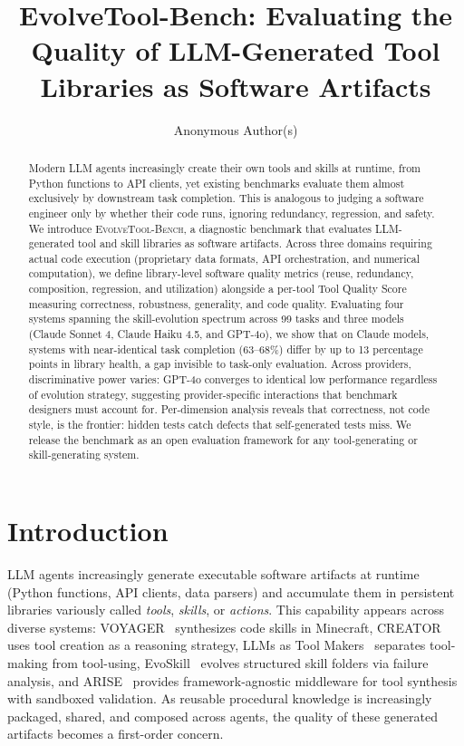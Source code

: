 \documentclass[sigplan,review,anonymous]{acmart}
\begin{document}
\title{EvolveTool-Bench: Evaluating the Quality of LLM-Generated Tool Libraries as Software Artifacts}

\author{Anonymous Author(s)}
\affiliation{\institution{}}

\begin{abstract}
Modern LLM agents increasingly create their own tools and skills at runtime, from Python functions to API clients, yet existing benchmarks evaluate them almost exclusively by downstream task completion. This is analogous to judging a software engineer only by whether their code runs, ignoring redundancy, regression, and safety. We introduce \textsc{EvolveTool-Bench}, a diagnostic benchmark that evaluates LLM-generated tool and skill libraries as software artifacts. Across three domains requiring actual code execution (proprietary data formats, API orchestration, and numerical computation), we define library-level software quality metrics (reuse, redundancy, composition, regression, and utilization) alongside a per-tool Tool Quality Score measuring correctness, robustness, generality, and code quality. Evaluating four systems spanning the skill-evolution spectrum across 99 tasks and three models (Claude Sonnet 4, Claude Haiku 4.5, and GPT-4o), we show that on Claude models, systems with near-identical task completion (63--68\%) differ by up to 13 percentage points in library health, a gap invisible to task-only evaluation. Across providers, discriminative power varies: GPT-4o converges to identical low performance regardless of evolution strategy, suggesting provider-specific interactions that benchmark designers must account for. Per-dimension analysis reveals that correctness, not code style, is the frontier: hidden tests catch defects that self-generated tests miss. We release the benchmark as an open evaluation framework for any tool-generating or skill-generating system.
\end{abstract}

\maketitle

\section{Introduction}

LLM agents increasingly generate executable software artifacts at runtime (Python functions, API clients, data parsers) and accumulate them in persistent libraries variously called \emph{tools}, \emph{skills}, or \emph{actions}. This capability appears across diverse systems: VOYAGER~\cite{wang2023voyager} synthesizes code skills in Minecraft, CREATOR~\cite{qian2023creator} uses tool creation as a reasoning strategy, LLMs as Tool Makers~\cite{cai2023latm} separates tool-making from tool-using, EvoSkill~\cite{alzubi2026evoskill} evolves structured skill folders via failure analysis, and ARISE~\cite{kaliyev2026arise} provides framework-agnostic middleware for tool synthesis with sandboxed validation. As reusable procedural knowledge is increasingly packaged, shared, and composed across agents, the quality of these generated artifacts becomes a first-order concern.
\end{document}
